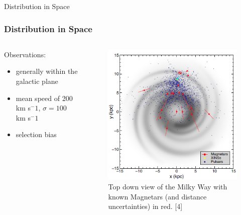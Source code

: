 \documentclass[hyperref=pdftex, presentation]{beamer}
\begin{document}
\begin{frame}{\Large Distribution in Space}
\frametitle{\Large Distribution in Space}

	\begin{minipage}[0.2\textheight]{\textwidth}
		\begin{columns}[T]
			\begin{column}{0.5\textwidth}
			
				\begin{block}{Observations:}
				
					\begin{itemize}
						 \item<2-> generally within the galactic plane %
						 \item<3-> mean speed of 200 km s$^-1$, $\sigma = 100$ km s$^-1$
						 \item<4-> selection bias
					\end{itemize}
				\end{block}
			\end{column}
			\begin{column}{0.5\textwidth}
				\begin{figure}
					\includegraphics[scale=.5]{figures/spatial.png}
					\caption{Top down view of the Milky Way with known Magnetars (and distance uncertainties) in red. [4]}
				\end{figure}
			\end{column}
		\end{columns}
	\end{minipage}

\end{frame}
\end{document}

